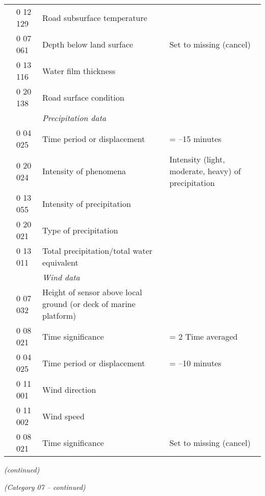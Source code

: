 \begin{longtable}[]{@{}llll@{}}
& 0 12 129 & Road subsurface temperature &\tabularnewline
& 0 07 061 & Depth below land surface & Set to missing (cancel)\tabularnewline
& 0 13 116 & Water film thickness &\tabularnewline
& 0 20 138 & Road surface condition &\tabularnewline
& & \emph{Precipitation data} &\tabularnewline
& 0 04 025 & Time period or displacement & = --15 minutes\tabularnewline
& 0 20 024 & Intensity of phenomena & Intensity (light, moderate, heavy) of precipitation\tabularnewline
& 0 13 055 & Intensity of precipitation &\tabularnewline
& 0 20 021 & Type of precipitation &\tabularnewline
& 0 13 011 & Total precipitation/total water equivalent &\tabularnewline
& & \emph{Wind data} &\tabularnewline
& 0 07 032 & Height of sensor above local ground (or deck of marine platform) &\tabularnewline
& 0 08 021 & Time significance & = 2 Time averaged\tabularnewline
& 0 04 025 & Time period or displacement & = --10 minutes\tabularnewline
& 0 11 001 & Wind direction &\tabularnewline
& 0 11 002 & Wind speed &\tabularnewline
& 0 08 021 & Time significance & Set to missing (cancel)\tabularnewline
\bottomrule
\end{longtable}

\emph{(continued)\\
}

\emph{(Category 07 -- continued)}

